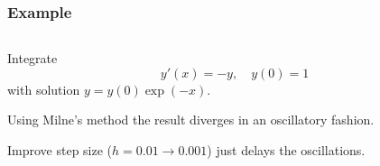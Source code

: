\documentclass{beamer}
\begin{document}
\begin{frame}
  \frametitle{Example}


  \begin{columns}
    \begin{column}{0.5\textwidth}
      Integrate
      \begin{equation*}
        y'(x) = -y, \quad y(0) = 1
      \end{equation*}
      with solution $y = y(0)\exp(-x)$. \pause

      \vspace{1ex}

      Using Milne's method the result diverges in an oscillatory
      fashion. \pause

      \vspace{1ex}

      Improve step size ($h = 0.01 \rightarrow 0.001$) just delays the
      oscillations. \pause

      \vspace{1ex}


\end{column}
\end{columns}
\end{frame}
\end{document}

